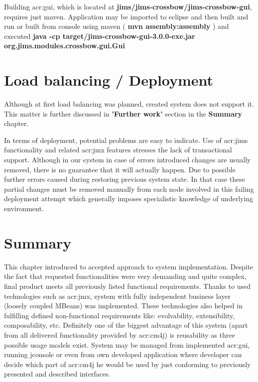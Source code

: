 \documentclass[11pt]{book}
\begin{document}
	  Building \gls{acr:gui}, which is located at \textbf{jims/jims-crossbow/jims-crossbow-gui}, requires just maven. Application may 
	  be imported to eclipse and then built and run or built from console using maven (\textbf{ mvn assembly:assembly })
	  and executed \textbf{java -cp target/jims-crossbow-gui-3.0.0-exe.jar org.jims.modules.crossbow.gui.Gui}


    \section{Load balancing / Deployment}
    \label{sec:impl:problems}
	  
		Although at first load balancing was planned, created system does not support it. This matter is further 
		discussed in \textbf{'Further work'} section in the \textbf{Summary} chapter.
		
		In terms of deployment, potential problems are easy to indicate. Use of \gls{acr:jims} functionality and related \gls{acr:jmx} 
		features stresses the lack of transactional support. Although in our system in case of errors introduced changes
		are usually removed, there is no guarantee that it will actually happen. Due to possible further errors caused during 
		restoring previous system state. In that case these partial changes must be removed manually from each node
		involved in this failing deployment attempt which generally imposes specialistic knowledge of underlying environment. 

    \section*{Summary}
    \label{sec:impl:summary}

      This chapter introduced to accepted approach to system implementation. Despite the fact that requested
      functionalities were very demanding and quite complex, final product meets all previously listed functional
      requirements. Thanks to used technologies such as \gls{acr:jmx}, system with fully independent business layer
      (loosely coupled MBeans) was implemented. These technologies also helped in fulfilling defined non-functional
      requirements like: evolvability, extensibility, composability, etc. Definitely one of the biggest advantage of
      this system (apart from all delivered functionality provided by \gls{acr:cm4j}) is reusability as three possible
      usage models exist. System may be managed from implemented \gls{acr:gui}, running jconsole or even from own
      developed application where developer can decide which part of \gls{acr:cm4j} he would be used by just
      conforming to previously presented and described interfaces.
\end{document}
